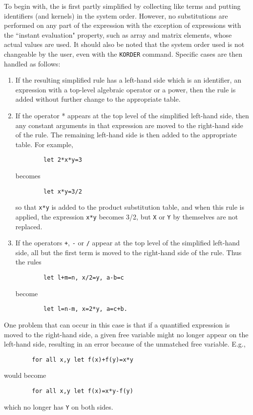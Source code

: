 To begin with, the {\tt <substitution expression>} is first partly simplified
by collecting like terms and putting identifiers (and kernels) in the
system order. However, no substitutions are performed on any part of the
expression with the exception of expressions with the ``instant evaluation"
property, such as array and matrix elements, whose actual values are used.
It should also be noted that the system order used is not changeable by the
user, even with the {\tt KORDER} command. Specific cases are then handled as
follows:
\begin{enumerate}
\item If the resulting simplified rule has a left-hand side which is an
identifier, an expression with a top-level algebraic operator or a power,
then the rule is added without further change to the appropriate table.

\item If the operator * appears at the top level of the simplified left-hand
side, then any constant arguments in that expression are moved to the
right-hand side of the rule.  The remaining left-hand side is then added
to the appropriate table.  For example,
\begin{verbatim}
        let 2*x*y=3
\end{verbatim}
becomes
\begin{verbatim}
        let x*y=3/2
\end{verbatim}
so that {\tt x*y} is added to the product substitution table, and when
this rule is applied, the expression {\tt x*y} becomes 3/2, but {\tt X} or
{\tt Y} by themselves are not replaced.

\item If the operators {\tt +}, {\tt -} or {\tt /} appear at the top level
of the simplified left-hand side, all but the first term is moved to the
right-hand side of the rule.  Thus the rules
\begin{verbatim}
        let l+m=n, x/2=y, a-b=c
\end{verbatim}
become
\begin{verbatim}
        let l=n-m, x=2*y, a=c+b.
\end{verbatim}
\end{enumerate}
One problem that can occur in this case is that if a quantified expression
is moved to the right-hand side, a given free variable might no longer
appear on the left-hand side, resulting in an error because of the
unmatched free variable. E.g.,
\begin{verbatim}
        for all x,y let f(x)+f(y)=x*y
\end{verbatim}
would become
\begin{verbatim}
        for all x,y let f(x)=x*y-f(y)
\end{verbatim}
which no longer has {\tt Y} on both sides.

